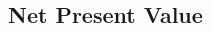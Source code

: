 \documentclass[final]{beamer}
\begin{document}
\begin{frame}[t]
\begin{multicols}{3}
\subsection{Net Present Value}




\end{multicols}

\end{frame}
\end{document}
